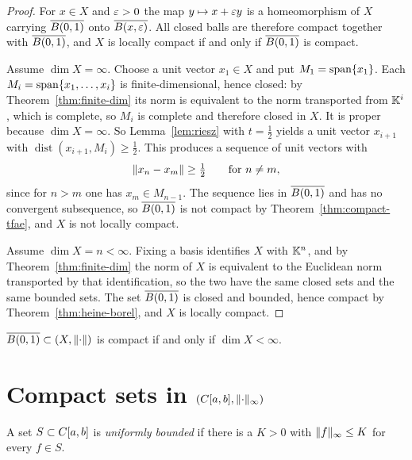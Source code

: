 \begin{proof}
For $x \in X$ and $\varepsilon > 0$ the map $y \mapsto x + \varepsilon y$ is a
homeomorphism of $X$ carrying $\overline{B(0,1)}$ onto $\overline{B(x,\varepsilon)}$. All closed
balls are therefore compact together with $\overline{B(0,1)}$, and $X$ is locally
compact if and only if $\overline{B(0,1)}$ is compact.

Assume $\dim X = \infty$. Choose a unit vector $x_1 \in X$ and put
$M_1 = \operatorname{span}\{x_1\}$. Each
$M_i = \operatorname{span}\{x_1, \dots, x_i\}$ is finite-dimensional, hence
closed: by Theorem~\ref{thm:finite-dim} its norm is equivalent to the norm
transported from $\mathbb{K}^i$, which is complete, so $M_i$ is complete and therefore
closed in $X$. It is proper because $\dim X = \infty$. So
Lemma~\ref{lem:riesz} with $t = \frac{1}{2}$ yields a unit vector $x_{i+1}$
with $\operatorname{dist}(x_{i+1}, M_i) \ge \frac{1}{2}$. This produces a
sequence of unit vectors with
\[
  \lVert x_n - x_m\rVert \ge \tfrac{1}{2} \qquad \text{for } n \ne m,
\]
since for $n > m$ one has $x_m \in M_{n-1}$. The sequence lies in
$\overline{B(0,1)}$ and has no convergent subsequence, so $\overline{B(0,1)}$ is not
compact by Theorem~\ref{thm:compact-tfae}, and $X$ is not locally compact.

Assume $\dim X = n < \infty$. Fixing a basis identifies $X$ with $\mathbb{K}^n$, and
by Theorem~\ref{thm:finite-dim} the norm of $X$ is equivalent to the
Euclidean norm transported by that identification, so the two have the same
closed sets and the same bounded sets. The set $\overline{B(0,1)}$ is closed and
bounded, hence compact by Theorem~\ref{thm:heine-borel}, and $X$ is locally
compact.
\end{proof}

\begin{corollary}\label{cor:unit-ball}
$\overline{B(0,1)} \subset (X, \lVert\cdot\rVert)$ is compact if and only if
$\dim X < \infty$.
\end{corollary}

\section{Compact sets in \texorpdfstring{$(C[a,b], \lVert\cdot\rVert_\infty)$}{C[a,b]}}

\begin{definition}\label{def:unif-bounded}
A set $S \subset C[a,b]$ is \emph{uniformly bounded} if there is a
$K > 0$ with $\lVert f\rVert_\infty \le K$ for every $f \in S$.
\end{definition}

